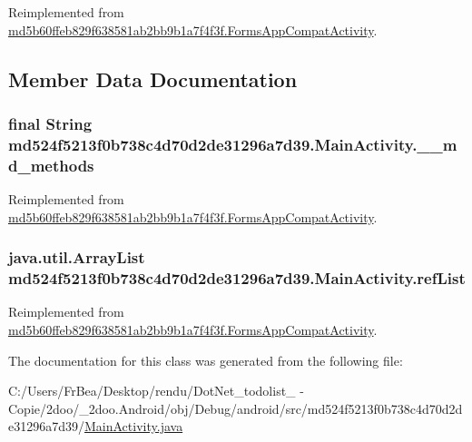 Reimplemented from \hyperlink{classmd5b60ffeb829f638581ab2bb9b1a7f4f3f_1_1_forms_app_compat_activity_54bbc6de9184a753b146e365d02fdaa1}{md5b60ffeb829f638581ab2bb9b1a7f4f3f.FormsAppCompatActivity}.

\subsection{Member Data Documentation}
\hypertarget{classmd524f5213f0b738c4d70d2de31296a7d39_1_1_main_activity_0700c8dda689213437fb119dde5ff411}{
\subsubsection[{\_\-\_\-md\_\-methods}]{\setlength{\rightskip}{0pt plus 5cm}final String {\bf md524f5213f0b738c4d70d2de31296a7d39.MainActivity.\_\-\_\-md\_\-methods}}}
\label{classmd524f5213f0b738c4d70d2de31296a7d39_1_1_main_activity_0700c8dda689213437fb119dde5ff411}




Reimplemented from \hyperlink{classmd5b60ffeb829f638581ab2bb9b1a7f4f3f_1_1_forms_app_compat_activity_2cb4fae3ad0f7b38c85c94c344df5089}{md5b60ffeb829f638581ab2bb9b1a7f4f3f.FormsAppCompatActivity}.\hypertarget{classmd524f5213f0b738c4d70d2de31296a7d39_1_1_main_activity_bb20fe5f20e2a815a5bc013b63706a44}{
\subsubsection[{refList}]{\setlength{\rightskip}{0pt plus 5cm}java.util.ArrayList {\bf md524f5213f0b738c4d70d2de31296a7d39.MainActivity.refList}}}
\label{classmd524f5213f0b738c4d70d2de31296a7d39_1_1_main_activity_bb20fe5f20e2a815a5bc013b63706a44}




Reimplemented from \hyperlink{classmd5b60ffeb829f638581ab2bb9b1a7f4f3f_1_1_forms_app_compat_activity_3c2387fd0251d4204c05843857d67c60}{md5b60ffeb829f638581ab2bb9b1a7f4f3f.FormsAppCompatActivity}.

The documentation for this class was generated from the following file:\begin{CompactItemize}
\item 
C:/Users/FrBea/Desktop/rendu/DotNet\_\-todolist\_ - Copie/2doo/\_\-2doo.Android/obj/Debug/android/src/md524f5213f0b738c4d70d2de31296a7d39/\hyperlink{_main_activity_8java}{MainActivity.java}\end{CompactItemize}
